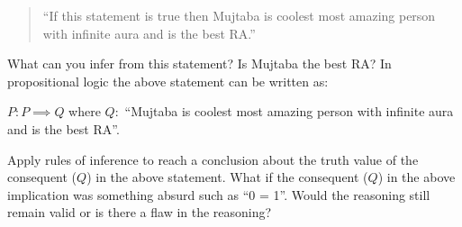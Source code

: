 \documentclass[a4paper]{exam}
\begin{document}
\begin{questions}
    \begin{quote}
        ``If this statement is true then Mujtaba is coolest most amazing person with infinite aura and is the best RA.''
    \end{quote}
    What can you infer from this statement? Is Mujtaba the best RA? In propositional logic the above statement can be written as:
     
    $P: P \implies Q$ where $Q:$ ``Mujtaba is coolest most amazing person with infinite aura and is the best RA''. 
    
    Apply rules of inference to reach a conclusion about the truth value of the consequent ($Q$) in the above statement. 
    What if the consequent ($Q$) in the above implication was something absurd such as ``0 = 1''. Would the reasoning still remain valid or is there a flaw in the reasoning? 
    \begin{solution}
    \end{solution}


      
\end{questions}
\end{document}

